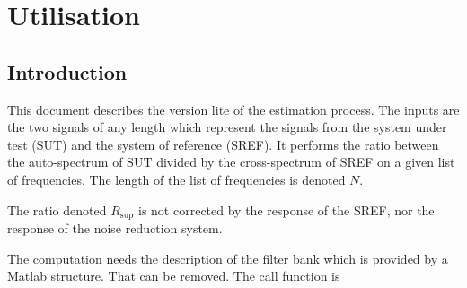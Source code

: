 \documentclass[a4paper, 12pt]{report}
\begin{document}
 \sloppy
 
\tableofcontents

\chapter{Utilisation}

\section{Introduction}
This document describes the version lite of the estimation process. The inputs are the two signals of any length which represent the signals from the system under test (SUT) and the system of reference (SREF). It performs the ratio between the auto-spectrum of SUT divided by the cross-spectrum of SREF on a given list of frequencies. The length of the list of frequencies is denoted $N$.

The ratio denoted $R_{\sup}$ is not corrected by the response of the SREF, nor the response of the noise reduction system.

The computation needs the description of the filter bank which is provided by a Matlab structure. That can be removed. The call function is

{\tiny}
\end{document}
